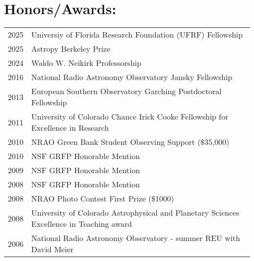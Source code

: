 \clearpage
\setlength{\extrarowheight}{0pt}
\section*{Honors/Awards: }
\begin{tabular}{ll}
     2025 & Universiy of Florida Research Foundation (UFRF) Fellowship \\
     2025 & Astropy Berkeley Prize \\
     2024 & Waldo W. Neikirk Professorship \\
     2016 & National Radio Astronomy Observatory Jansky Fellowship \\
     2013 & European Southern Observatory Garching Postdoctoral Fellowship \\
     2011 & University of Colorado Chance Irick Cooke Fellowship for Excellence in Research \\
     2010 & NRAO Green Bank Student Observing Support (\$35,000) \\
     2010 & NSF GRFP Honorable Mention \\
     2009 & NSF GRFP Honorable Mention \\
     2008 & NSF GRFP Honorable Mention \\
     2008 & NRAO Photo Contest First Prize (\$1000)\\
     2008 & University of Colorado Astrophysical and Planetary Sciences Excellence in Teaching award  \\
     2006 & National Radio Astronomy Observatory - summer REU with David Meier  \\
\end{tabular}


